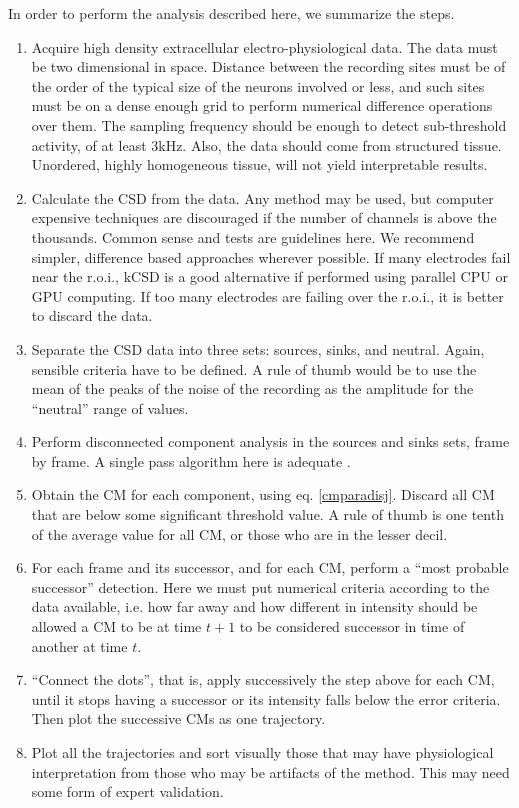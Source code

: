 \documentclass[letterpaper,12pts]{article}
\begin{document}
 In order to perform the analysis described here, we summarize the steps.
 \begin{enumerate}
 \item Acquire high density extracellular electro-physiological data. The data must be two
   dimensional
   in space. Distance between the recording sites must be of the order of the typical
   size of the neurons involved or less, and such sites must be on a dense enough grid to perform numerical difference operations over them.
   The sampling frequency should be enough to detect sub-threshold activity,
   of at least 3kHz. Also, the data should come from structured tissue.
   Unordered, highly homogeneous tissue, will not yield interpretable results. 
 \item Calculate the CSD from the data. Any method may be used,
   but computer expensive techniques are discouraged if the
   number of channels is above the thousands.
   Common sense and tests are guidelines here.
   We recommend simpler, difference based approaches wherever possible.
   If many electrodes fail near the r.o.i.,
   kCSD is a good alternative if performed using
   parallel CPU or GPU computing.
   If too many electrodes are failing over the r.o.i.,
   it is better to discard the data. 
 \item Separate the CSD data into three sets: sources, sinks, and neutral.
   Again, sensible criteria have to be defined.
   A rule of thumb would be to use the mean of the peaks of the noise  of the recording as the amplitude for the ``neutral'' range of values. 
\item Perform disconnected component analysis in the sources and sinks sets, frame by frame.
  A single pass algorithm here is  adequate \cite{Vincent91, Abubaker07}.
\item  Obtain the CM for each component, using eq. \ref{cmparadisj}. Discard
  all CM that are below some significant threshold value. A rule of thumb is one tenth of the average value for all CM,
  or those who are in the lesser decil. 
\item For each frame and its successor, and for each CM, perform a ``most probable successor'' detection. Here we must put numerical criteria according to the data available, i.e. how far away and how different in intensity should be allowed a CM to be at time $t+1$ to be considered successor in time of another at time $t$.
\item ``Connect the dots'', that is, apply successively the step above for each CM, until it stops having a successor or its intensity falls below the error criteria. Then plot the successive CMs as one trajectory.
\item Plot all the trajectories and sort visually those that may have physiological interpretation from those who may be artifacts of the method. This may need some form of expert validation.
 \end{enumerate}
 
\end{document}
